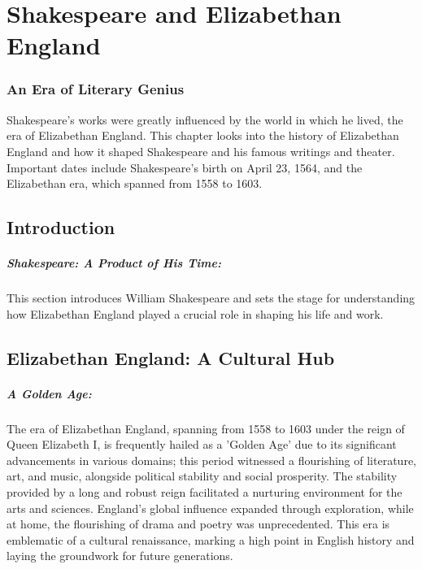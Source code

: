 \documentclass{book}
\begin{document}


\chapter{Shakespeare and Elizabethan England}
\subsection*{An Era of Literary Genius}
Shakespeare's works were greatly influenced by the world in which he lived, the era of Elizabethan England. This chapter looks into the history of Elizabethan England and how it shaped Shakespeare and his famous writings and theater. Important dates include Shakespeare's birth on April 23, 1564, and the Elizabethan era, which spanned from 1558 to 1603.

\section*{Introduction}

\paragraph{Shakespeare: A Product of His Time:}
This section introduces William Shakespeare and sets the stage for understanding how Elizabethan England played a crucial role in shaping his life and work.

\section*{Elizabethan England: A Cultural Hub}

\paragraph{A Golden Age:}
The era of Elizabethan England, spanning from 1558 to 1603 under the reign of Queen Elizabeth I, is frequently hailed as a 'Golden Age' due to its significant advancements in various domains; this period witnessed a flourishing of literature, art, and music, alongside political stability and social prosperity. The stability provided by a long and robust reign facilitated a nurturing environment for the arts and sciences. England’s global influence expanded through exploration, while at home, the flourishing of drama and poetry was unprecedented. This era is emblematic of a cultural renaissance, marking a high point in English history and laying the groundwork for future generations.
\end{document}

